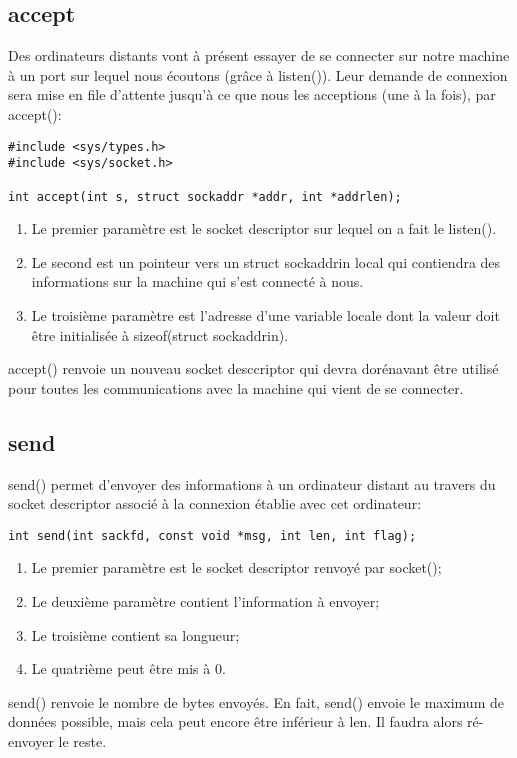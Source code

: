 \documentclass[a4paper]{article}
\begin{document}
\subsection{accept}
Des ordinateurs distants vont à présent essayer de se connecter sur notre machine à un port sur lequel nous écoutons (grâce à listen()). Leur demande de connexion sera mise en file d'attente jusqu'à ce que nous les acceptions (une à la fois), par accept():
\begin{lstlisting}
#include <sys/types.h>
#include <sys/socket.h>

int accept(int s, struct sockaddr *addr, int *addrlen);
\end{lstlisting}
\begin{enumerate}
  \item Le premier paramètre est le socket descriptor sur lequel on a fait le listen().
  \item Le second est un pointeur vers un struct sockaddr\textunderscore{}in local qui contiendra des informations sur la machine qui s'est connecté à nous.
  \item Le troisième paramètre est l'adresse d'une variable locale dont la valeur doit être initialisée à sizeof(struct sockaddr\textunderscore{}in).
\end{enumerate}
accept() renvoie un nouveau socket desccriptor qui devra dorénavant être utilisé pour toutes les communications avec la machine qui vient de se connecter.
\subsection{send}
send() permet d'envoyer des informations à un ordinateur distant au travers du socket descriptor associé à la connexion établie avec cet ordinateur:
\begin{lstlisting}
int send(int sackfd, const void *msg, int len, int flag);
\end{lstlisting}
\begin{enumerate}
  \item Le premier paramètre est le socket descriptor renvoyé par socket();
  \item Le deuxième paramètre contient l'information à envoyer;
  \item Le troisième contient sa longueur;
  \item Le quatrième peut être mis à 0.
\end{enumerate}
send() renvoie le nombre de bytes envoyés. En fait, send() envoie le maximum de données possible, mais cela peut encore être inférieur à len. Il faudra alors ré-envoyer le reste.
\end{document}
